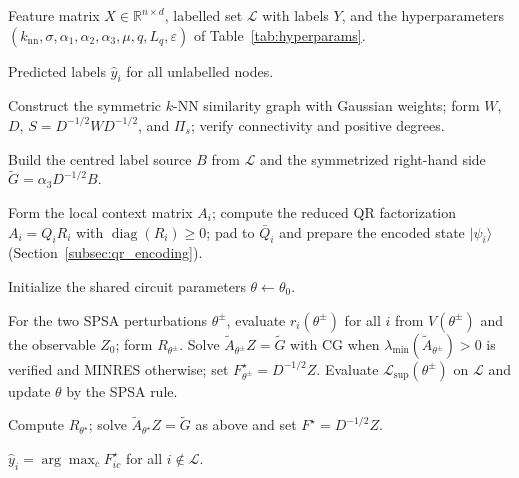 \documentclass[11pt,a4paper]{article}
\DeclareMathOperator{\diag}{diag}
\newcommand{\R}{\mathbb{R}}
\begin{document}

\begin{algorithm}[H]
\caption{\textsc{IPQSSL}: Improved Poisson Quantum Semi-Supervised Learning}
\label{alg:ipqssl}
\begin{algorithmic}[1]

\Require
Feature matrix \(X\in\R^{n\times d}\), labelled set \(\mathcal L\) with
labels \(Y\), and the hyperparameters
\((k_{\mathrm{nn}},\sigma,\alpha_1,\alpha_2,\alpha_3,\mu,q,L_q,\varepsilon)\)
of Table~\ref{tab:hyperparams}.

\Ensure
Predicted labels \(\widehat y_i\) for all unlabelled nodes.

\State Construct the symmetric \(k\)-NN similarity graph with Gaussian
weights; form \(W\), \(D\), \(S=D^{-1/2}WD^{-1/2}\), and \(\Pi_s\); verify
connectivity and positive degrees.

\State Build the centred label source \(B\) from \(\mathcal L\) and the
symmetrized right-hand side \(\widetilde G=\alpha_3D^{-1/2}B\).

    \State Form the local context matrix \(A_i\); compute the reduced QR
    factorization \(A_i=Q_iR_i\) with \(\diag(R_i)\ge 0\); pad to
    \(\bar Q_i\) and prepare the encoded state \(|\psi_i\rangle\)
    (Section~\ref{subsec:qr_encoding}).
\EndFor

\State Initialize the shared circuit parameters \(\theta\gets\theta_0\).

\Repeat {}
    \State For the two SPSA perturbations \(\theta^{\pm}\), evaluate
    \(r_i(\theta^{\pm})\) for all \(i\) from \(V(\theta^{\pm})\) and the
    observable \(Z_0\); form \(R_{\theta^{\pm}}\).
    \State Solve
    \(\widetilde A_{\theta^{\pm}}Z=\widetilde G\)
    with CG when \(\lambda_{\min}(\widetilde A_{\theta^{\pm}})>0\) is
    verified and MINRES otherwise; set
    \(F^{\star}_{\theta^{\pm}}=D^{-1/2}Z\).
    \State Evaluate \(\mathcal L_{\mathrm{sup}}(\theta^{\pm})\) on
    \(\mathcal L\) and update \(\theta\) by the SPSA rule.

\State Compute \(R_{\theta^{\star}}\); solve
\(\widetilde A_{\theta^{\star}}Z=\widetilde G\) as above and set
\(F^{\star}=D^{-1/2}Z\).

\State \Return
\(\widehat y_i=\arg\max_{c}F^{\star}_{ic}\) for all \(i\notin\mathcal L\).

\end{algorithmic}
\end{algorithm}
\end{document}
